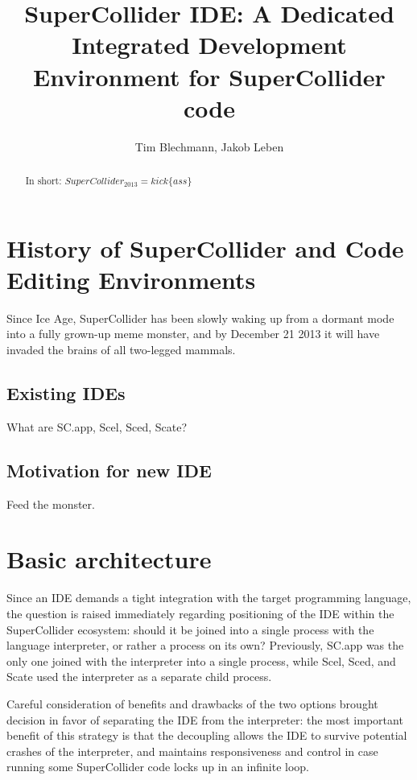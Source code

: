 \documentclass[a4paper,10pt]{article}
\title{SuperCollider IDE: A Dedicated Integrated Development Environment for SuperCollider code}
\author{Tim Blechmann, Jakob Leben}
\begin{document}
\maketitle

\begin{abstract}
In short: $SuperCollider_{2013} = kick\{ass\}$
\end{abstract}

\section{History of SuperCollider and Code Editing Environments}

Since Ice Age, SuperCollider has been slowly waking up from a dormant mode into a fully grown-up
meme monster, and by December 21 2013 it will have invaded the brains of all two-legged mammals.

\subsection{Existing IDEs}

What are SC.app, Scel, Sced, Scate?

\subsection{Motivation for new IDE}

Feed the monster.

\section{Basic architecture}

Since an IDE demands a tight integration with the target programming language, the question is
raised immediately regarding positioning of the IDE within the SuperCollider ecosystem: should it be
joined into a single process with the language interpreter, or rather a process on its own?
Previously, SC.app was the only one joined with the interpreter into a single process, while Scel,
Sced, and Scate used the interpreter as a separate child process.

Careful consideration of benefits and drawbacks of the two options brought decision in favor of
separating the IDE from the interpreter: the most important benefit of this strategy is that the
decoupling allows the IDE to survive potential crashes of the interpreter, and maintains
responsiveness and control in case running some SuperCollider code locks up in an infinite loop.
\end{document}
